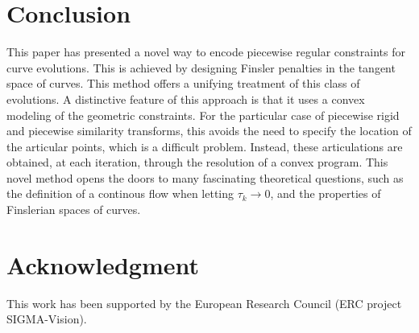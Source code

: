 \section*{Conclusion}

This paper has presented a novel way to encode piecewise regular constraints for curve evolutions. This is achieved by designing Finsler penalties in the tangent space of curves. This method offers a unifying treatment of this class of evolutions. A distinctive feature of this approach is that it uses a convex modeling of the geometric constraints. For the particular case of piecewise rigid and piecewise similarity transforms, this avoids the need to specify	the location of the articular points, which is a difficult problem. Instead, these articulations are obtained, at each iteration, through the resolution of a convex program. This novel method opens the doors to many fascinating theoretical questions, such as the definition of a continous flow when letting $\tau_k \rightarrow 0$, and the properties of Finslerian spaces of curves. 

\section*{Acknowledgment}

This work has been supported by the European Research Council (ERC project SIGMA-Vision).
